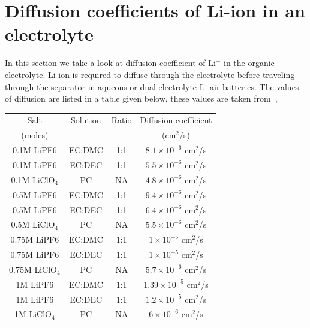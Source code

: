 \documentclass[12pt]{book}
\begin{document}
\section{Diffusion coefficients of Li-ion in an electrolyte}
In this section we take a look at diffusion coefficient of Li$^+$ in the organic electrolyte. Li-ion is required to diffuse through the electrolyte before traveling through the separator in aqueous or dual-electrolyte Li-air batteries.
The values of diffusion are listed in a table given below, these values are taken from~\cite{Lee2002},
\begin{center}
\begin{tabular}{ |c|c|c|c| }
 \hline
 Salt & Solution & Ratio & Diffusion coefficient \\
 (moles) &  &  & (cm$^2$/s)\\
 \hline
0.1M LiPF6 & EC:DMC & 1:1 & $8.1\times10^{-6}$ cm$^2$/s\\
0.1M LiPF6 & EC:DEC & 1:1 & $5.5\times10^{-6}$ cm$^2$/s\\
0.1M LiClO$_4$ & PC & NA & $4.8\times10^{-6}$ cm$^2$/s\\
0.5M LiPF6 & EC:DMC & 1:1 & $9.4\times10^{-6}$ cm$^2$/s\\
0.5M LiPF6 & EC:DEC & 1:1 & $6.4\times10^{-6}$ cm$^2$/s\\
0.5M LiClO$_4$ & PC & NA & $5.5\times10^{-6}$ cm$^2$/s\\
0.75M LiPF6 & EC:DMC & 1:1 & $1\times10^{-5}$ cm$^2$/s\\
0.75M LiPF6 & EC:DEC & 1:1 & $1\times10^{-5}$ cm$^2$/s\\
0.75M LiClO$_4$ & PC & NA & $5.7\times10^{-6}$ cm$^2$/s\\
1M LiPF6 & EC:DMC & 1:1 & $1.39\times10^{-5}$ cm$^2$/s\\
1M LiPF6 & EC:DEC & 1:1 & $1.2\times10^{-5}$ cm$^2$/s\\
1M LiClO$_4$ & PC & NA & $6\times10^{-6}$ cm$^2$/s\\
  \hline
\end{tabular}
\end{center}
\end{document}
